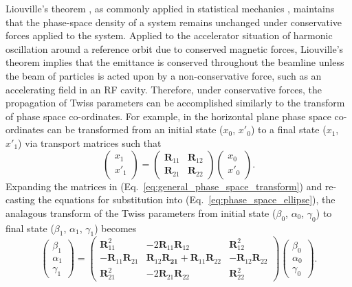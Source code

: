 \documentclass[../main.tex]{subfiles}
\begin{document}
Liouville's theorem \cite{liouville1838note}, as commonly applied in statistical mechanics \cite{gibbs1902elementary}, maintains that the phase-space density of a system remains unchanged under conservative forces applied to the system. Applied to the accelerator situation of harmonic oscillation around a reference orbit due to conserved magnetic forces, Liouville's theorem implies that the emittance is conserved throughout the beamline unless the beam of particles is acted upon by a non-conservative force, such as an accelerating field in an RF cavity. Therefore, under conservative forces, the propagation of Twiss parameters can be accomplished similarly to the transform of phase space co-ordinates. For example, in the horizontal plane phase space co-ordinates can be transformed from an initial state ($x_{0}$, $x'_{0}$) to a final state ($x_{1}$, $x'_{1}$) via transport matrices such that
\begin{equation}
\begin{pmatrix}
x_{1} \\
x'_{1}
\end{pmatrix}
=
\begin{pmatrix}
\boldsymbol{R}_{11} & \boldsymbol{R}_{12} \\
\boldsymbol{R}_{21} & \boldsymbol{R}_{22}
\end{pmatrix}
\begin{pmatrix}
x_{0} \\
x'_{0}
\end{pmatrix}.
\label{eq:general_phase_space_transform}
\end{equation}
Expanding the matrices in (Eq.~\ref{eq:general_phase_space_transform}) and re-casting the equations for substitution into (Eq.~\ref{eq:phase_space_ellipse}), the analagous transform of the Twiss parameters from initial state ($\beta_{0}$, $\alpha_{0}$, $\gamma_{0}$) to final state ($\beta_{1}$, $\alpha_{1}$, $\gamma_{1}$) becomes 
\begin{equation}
\begin{pmatrix}
\beta_{1} \\
\alpha_{1} \\
\gamma_{1} 
\end{pmatrix}
=
\begin{pmatrix}
\boldsymbol{R}_{11}^{2} & -2\boldsymbol{R}_{11}\boldsymbol{R}_{12} & \boldsymbol{R}_{12}^{2} \\
-\boldsymbol{R}_{11}\boldsymbol{R}_{21} & \boldsymbol{R}_{12}\boldsymbol{R_{21}}+\boldsymbol{R}_{11}\boldsymbol{R}_{22} & -\boldsymbol{R}_{12}\boldsymbol{R}_{22} \\
\boldsymbol{R}_{21}^{2} & -2\boldsymbol{R}_{21}\boldsymbol{R}_{22} & \boldsymbol{R}_{22}^{2} 
\end{pmatrix}
\begin{pmatrix}
\beta_{0} \\
\alpha_{0} \\
\gamma_{0}
\end{pmatrix}.
\label{eq:general_Twiss_transform}
\end{equation}
\end{document}
